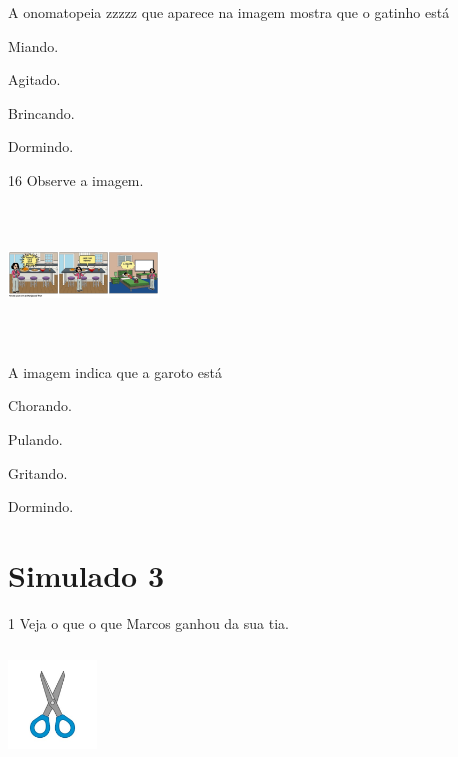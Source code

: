 
A onomatopeia zzzzz que aparece na imagem mostra que o gatinho está

\begin{escolha}
\item Miando.

\item Agitado.

\item Brincando.

\item Dormindo.
\end{escolha}

\num{16} Observe a imagem.

\includegraphics[width=1.57333in,height=1.45456in]{media/image162.png}


A imagem indica que a garoto está

\begin{escolha}
\item Chorando.

\item Pulando.

\item Gritando.

\item Dormindo.
\end{escolha}

\chapter{Simulado 3}

\num{1} Veja o que o que Marcos ganhou da sua tia.

\includegraphics[width=0.92708in,height=1.18125in]{media/image163.jpeg}

